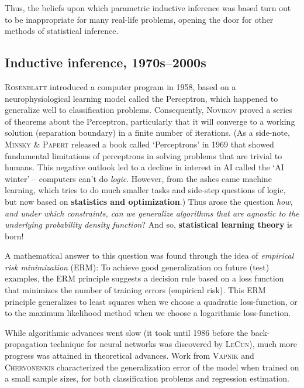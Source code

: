 \documentclass{article}
\begin{document}
Thus, the beliefs upon which parametric inductive inference was based turn out to be inappropriate for many real-life problems, opening the door for other methods of statistical inference.

\subsection{Inductive inference, 1970s--2000s}
\textsc{Rosenblatt} introduced a computer program in 1958, based on a neurophysiological learning model called the Perceptron, which happened to generalize well to classification problems. Consequently, \textsc{Novikov} proved a series of theorems about the Perceptron, particularly that it will converge to a working solution (separation boundary) in a finite number of iterations. (As a side-note, \textsc{Minsky \& Papert} released a book called `Perceptrons' in 1969 that showed fundamental limitations of perceptrons in solving problems that are trivial to humans. This negative outlook led to a decline in interest in AI called the `AI winter' -- computers can't do \textit{logic}. However, from the ashes came machine learning, which tries to do much smaller tasks and side-step questions of logic, but now based on \textbf{statistics and optimization}.) Thus arose the question \textit{how, and under which constraints, can we generalize algorithms that are agnostic to the underlying probability density function}? And so, \textbf{statistical learning theory} is born!

A mathematical answer to this question was found through the idea of \textit{empirical risk minimization} (ERM): To achieve good generalization on future (test) examples, the ERM principle suggests a decision rule based on a loss function that minimizes the number of training errors (empirical risk). This ERM principle generalizes to least squares when we choose a quadratic loss-function, or to the maximum likelihood method when we choose a logarithmic loss-function.

While algorithmic advances went slow (it took until 1986 before the back-propagation technique for neural networks was discovered by \textsc{LeCun}), much more progress was attained in theoretical advances. Work from \textsc{Vapnik} and \textsc{Chervonenkis} characterized the generalization error of the model when trained on a small sample sizes, for both classification problems and regression estimation.
\end{document}
